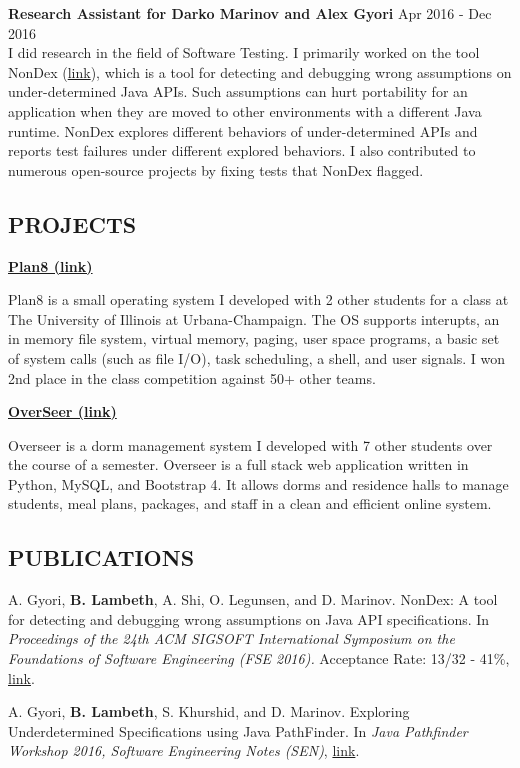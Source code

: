 \documentclass[10pt, letterpaper]{article}
\begin{document}
\textbf{Research Assistant for Darko Marinov and Alex Gyori} \hfill Apr 2016 -
Dec 2016 \\
I did research in the field of Software Testing. I primarily worked on the tool
NonDex  (\href{https://github.com/TestingResearchIllinois/NonDex}{link}), which
is a tool for detecting and debugging wrong assumptions on
under-determined Java APIs. Such assumptions can hurt portability for an
application when they are moved to other environments with a different Java
runtime. NonDex explores different behaviors of under-determined APIs and
reports test failures under different explored behaviors. I also contributed to numerous open-source projects by fixing tests that NonDex flagged.

\smallskip
{\centering \subsection*{PROJECTS} \par}

\textbf{\href{https://github.com/azy2/plan8/tree/master/student-distrib}{Plan8
    (link)}} \par
Plan8 is a small operating system I developed with 2 other students for a class at
The University of Illinois at Urbana-Champaign. The OS supports interupts, an in
memory file system, virtual memory, paging, user space programs, a basic set of
system calls (such as file I/O), task scheduling, a shell, and user signals. I
won 2nd place in the class competition against 50+ other teams.

\textbf{\href{https://github.com/azy2/Overseer/}{OverSeer (link)}} \par
Overseer is a dorm management system I developed with 7 other students over the
course of a semester. Overseer is a full stack web application written in
Python, MySQL, and Bootstrap 4. It allows dorms and residence halls to manage
students, meal plans, packages, and staff in a clean and efficient online system.

\smallskip
{\centering \subsection*{PUBLICATIONS} \par}

A. Gyori, \textbf{B. Lambeth}, A. Shi, O. Legunsen, and D. Marinov. NonDex: A tool for detecting and debugging wrong assumptions on Java API specifications. In \textit{Proceedings of the 24th ACM SIGSOFT International Symposium on the Foundations of Software Engineering (FSE 2016).} Acceptance Rate: 13/32 - 41\%, \href{https://doi.org/10.1145/2950290.2983932}{link}.
\par
A. Gyori, \textbf{B. Lambeth}, S. Khurshid, and D. Marinov. Exploring Underdetermined Specifications using Java PathFinder. In \textit{Java Pathfinder Workshop 2016, Software Engineering Notes (SEN)}, \href{http://mir.cs.illinois.edu/~gyori/pubs/jpf16.pdf}{link}.
\end{document}
